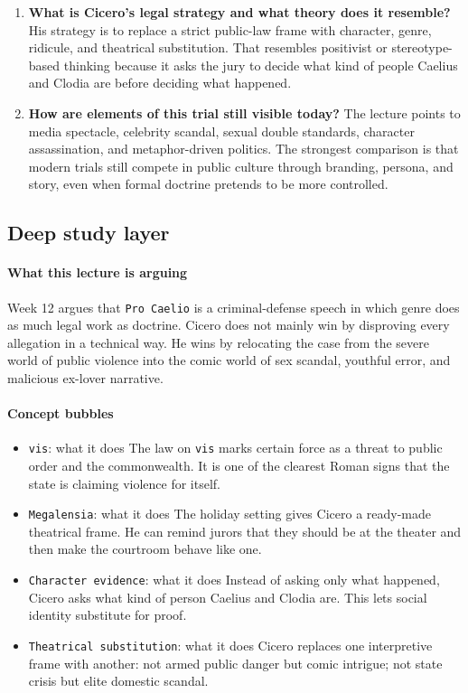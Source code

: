 \documentclass[11pt]{article}
\begin{document}
\begin{enumerate}
\item \textbf{What is Cicero's legal strategy and what theory does it resemble?} His strategy is to replace a strict public-law frame with character, genre, ridicule, and theatrical substitution. That resembles positivist or stereotype-based thinking because it asks the jury to decide what kind of people Caelius and Clodia are before deciding what happened.
\item \textbf{How are elements of this trial still visible today?} The lecture points to media spectacle, celebrity scandal, sexual double standards, character assassination, and metaphor-driven politics. The strongest comparison is that modern trials still compete in public culture through branding, persona, and story, even when formal doctrine pretends to be more controlled.
\end{enumerate}

\subsection{Deep study layer}

\paragraph{What this lecture is arguing}

Week 12 argues that \texttt{Pro Caelio} is a criminal-defense speech in which genre does as much legal work as doctrine. Cicero does not mainly win by disproving every allegation in a technical way. He wins by relocating the case from the severe world of public violence into the comic world of sex scandal, youthful error, and malicious ex-lover narrative.

\paragraph{Concept bubbles}

\begin{itemize}
\item \texttt{vis}: what it does The law on \texttt{vis} marks certain force as a threat to public order and the commonwealth. It is one of the clearest Roman signs that the state is claiming violence for itself.
\item \texttt{Megalensia}: what it does The holiday setting gives Cicero a ready-made theatrical frame. He can remind jurors that they should be at the theater and then make the courtroom behave like one.
\item \texttt{Character evidence}: what it does Instead of asking only what happened, Cicero asks what kind of person Caelius and Clodia are. This lets social identity substitute for proof.
\item \texttt{Theatrical substitution}: what it does Cicero replaces one interpretive frame with another: not armed public danger but comic intrigue; not state crisis but elite domestic scandal.
\end{itemize}
\end{document}
